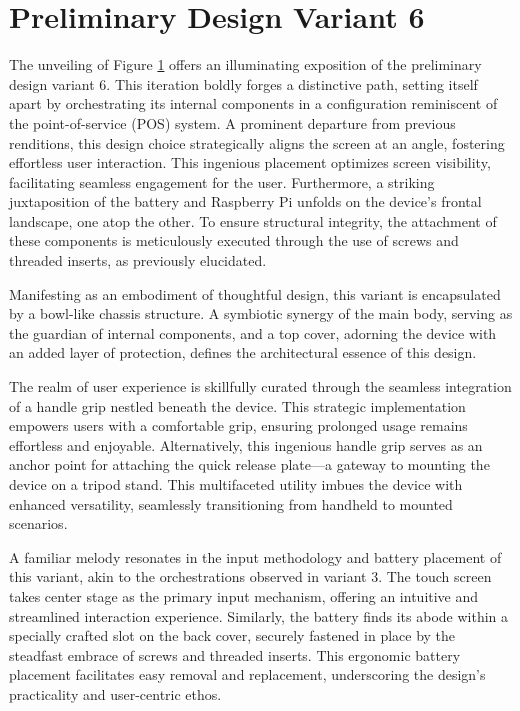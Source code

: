 \section{Preliminary Design Variant 6}

The unveiling of Figure \ref{} offers an illuminating exposition of the preliminary design variant 6. This iteration boldly forges a distinctive path, setting itself apart by orchestrating its internal components in a configuration reminiscent of the point-of-service (POS) system. A prominent departure from previous renditions, this design choice strategically aligns the screen at an angle, fostering effortless user interaction. This ingenious placement optimizes screen visibility, facilitating seamless engagement for the user. Furthermore, a striking juxtaposition of the battery and Raspberry Pi unfolds on the device's frontal landscape, one atop the other. To ensure structural integrity, the attachment of these components is meticulously executed through the use of screws and threaded inserts, as previously elucidated.

Manifesting as an embodiment of thoughtful design, this variant is encapsulated by a bowl-like chassis structure. A symbiotic synergy of the main body, serving as the guardian of internal components, and a top cover, adorning the device with an added layer of protection, defines the architectural essence of this design.

The realm of user experience is skillfully curated through the seamless integration of a handle grip nestled beneath the device. This strategic implementation empowers users with a comfortable grip, ensuring prolonged usage remains effortless and enjoyable. Alternatively, this ingenious handle grip serves as an anchor point for attaching the quick release plate—a gateway to mounting the device on a tripod stand. This multifaceted utility imbues the device with enhanced versatility, seamlessly transitioning from handheld to mounted scenarios.

A familiar melody resonates in the input methodology and battery placement of this variant, akin to the orchestrations observed in variant 3. The touch screen takes center stage as the primary input mechanism, offering an intuitive and streamlined interaction experience. Similarly, the battery finds its abode within a specially crafted slot on the back cover, securely fastened in place by the steadfast embrace of screws and threaded inserts. This ergonomic battery placement facilitates easy removal and replacement, underscoring the design's practicality and user-centric ethos.

